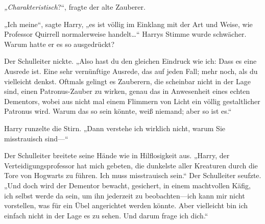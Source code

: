 \emph{„Charakteristisch}?“, fragte der alte Zauberer.

„Ich meine“, sagte Harry, „es ist völlig im Einklang mit der Art und Weise, wie Professor Quirrell normalerweise handelt…“ Harrys Stimme wurde schwächer. Warum hatte er es so ausgedrückt?

Der Schulleiter nickte. „Also hast du den gleichen Eindruck wie ich: Dass es eine Ausrede ist. Eine sehr vernünftige Ausrede, das auf jeden Fall; mehr noch, als du vielleicht denkst. Oftmals gelingt es Zauberern, die scheinbar nicht in der Lage sind, einen Patronus-Zauber zu wirken, genau das in Anwesenheit eines echten Dementors, wobei aus nicht mal einem Flimmern von Licht ein völlig gestaltlicher Patronus wird. Warum das so sein könnte, weiß niemand; aber so ist es.“

Harry runzelte die Stirn. „Dann verstehe ich wirklich nicht, warum Sie misstrauisch sind—“

Der Schulleiter breitete seine Hände wie in Hilflosigkeit aus. „Harry, der Verteidigungsprofessor hat mich gebeten, die dunkelste aller Kreaturen durch die Tore von Hogwarts zu führen. Ich muss misstrauisch sein.“ Der Schulleiter seufzte. „Und doch wird der Dementor bewacht, gesichert, in einem machtvollen Käfig, ich selbst werde da sein, um ihn jederzeit zu beobachten—ich kann mir nicht vorstellen, was für ein Übel angerichtet werden könnte. Aber vielleicht bin ich einfach nicht in der Lage es zu sehen. Und darum frage ich dich.“

